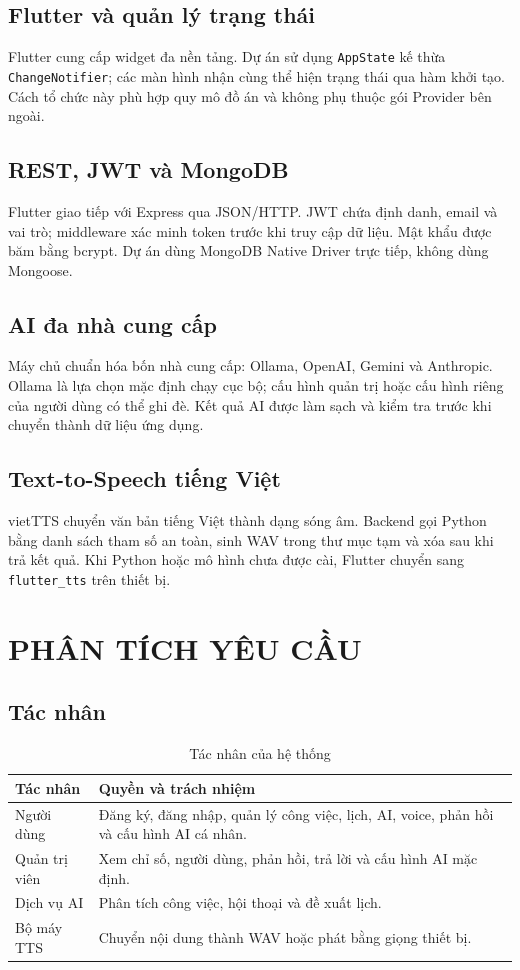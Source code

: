 \documentclass[12pt,a4paper,oneside]{report}
\begin{document}
\section{Flutter và quản lý trạng thái}
Flutter cung cấp widget đa nền tảng. Dự án sử dụng \texttt{AppState} kế thừa
\texttt{ChangeNotifier}; các màn hình nhận cùng thể hiện trạng thái qua hàm khởi tạo.
Cách tổ chức này phù hợp quy mô đồ án và không phụ thuộc gói Provider bên ngoài.

\section{REST, JWT và MongoDB}
Flutter giao tiếp với Express qua JSON/HTTP. JWT chứa định danh, email và vai trò;
middleware xác minh token trước khi truy cập dữ liệu. Mật khẩu được băm bằng bcrypt.
Dự án dùng MongoDB Native Driver trực tiếp, không dùng Mongoose.

\section{AI đa nhà cung cấp}
Máy chủ chuẩn hóa bốn nhà cung cấp: Ollama, OpenAI, Gemini và Anthropic. Ollama là
lựa chọn mặc định chạy cục bộ; cấu hình quản trị hoặc cấu hình riêng của người dùng có
thể ghi đè. Kết quả AI được làm sạch và kiểm tra trước khi chuyển thành dữ liệu ứng dụng.

\section{Text-to-Speech tiếng Việt}
vietTTS chuyển văn bản tiếng Việt thành dạng sóng âm. Backend gọi Python bằng danh
sách tham số an toàn, sinh WAV trong thư mục tạm và xóa sau khi trả kết quả. Khi Python
hoặc mô hình chưa được cài, Flutter chuyển sang \texttt{flutter\_tts} trên thiết bị.

\chapter{PHÂN TÍCH YÊU CẦU}
\section{Tác nhân}
\begin{table}[H]\centering\caption{Tác nhân của hệ thống}
\begin{tabularx}{\textwidth}{p{3.2cm}X}\toprule
\textbf{Tác nhân} & \textbf{Quyền và trách nhiệm}\\\midrule
Người dùng & Đăng ký, đăng nhập, quản lý công việc, lịch, AI, voice, phản hồi và cấu hình AI cá nhân.\\
Quản trị viên & Xem chỉ số, người dùng, phản hồi, trả lời và cấu hình AI mặc định.\\
Dịch vụ AI & Phân tích công việc, hội thoại và đề xuất lịch.\\
Bộ máy TTS & Chuyển nội dung thành WAV hoặc phát bằng giọng thiết bị.\\\bottomrule
\end{tabularx}\end{table}
\end{document}
